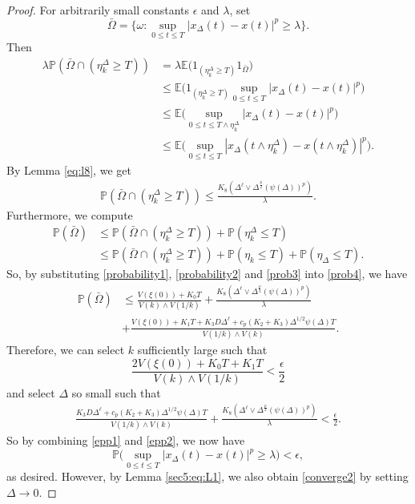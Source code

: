 \documentclass[11pt]{article}
\begin{document}
\begin{proof}
For arbitrarily small constants $\epsilon$ and $\lambda$, set
\begin{equation*}
\bar{\Omega}=\Big\{\omega: \sup_{0\leq t \leq T}|x_{\Delta}(t)-x(t)|^p\ge \lambda\Big\}.
\end{equation*}
Then
\begin{align*}
\lambda\mathbb{P}(\bar{\Omega}\cap(\eta^{\Delta}_k\ge T))&=\lambda\mathbb{E}\Big( 1_{(\eta^{\Delta}_k\ge T)} 1_{\bar{\Omega}}\Big)\\
&\le \mathbb{E}\Big( 1_{(\eta^{\Delta}_k\ge T)} \sup_{0\leq t \leq T}|x_{\Delta}(t)-x(t)|^p\Big)\\
&\le \mathbb{E}\Big(\sup_{0\leq t \leq T\wedge \eta^{\Delta}_k}|x_{\Delta}(t)-x(t)|^p\Big)\\
&\le \mathbb{E}\Big(\sup_{0\leq t \leq T}|x_{\Delta}(t\wedge \eta^{\Delta}_k)-x(t\wedge \eta^{\Delta}_k)|^p\Big). 
\end{align*}
By Lemma \ref{eq:l8}, we get
\begin{align}\label{prob3}
\mathbb{P}(\bar{\Omega}\cap(\eta^{\Delta}_k\ge T))\le \frac{K_8(\Delta^{\ell}\vee\Delta^{\frac{p}{2}}(\psi(\Delta))^p)}{\lambda}.
\end{align}
Furthermore, we compute
\begin{align}\label{prob4}
\mathbb{P}(\bar{\Omega})&\le \mathbb{P}(\bar{\Omega}\cap(\eta^{\Delta}_k\ge T))+\mathbb{P}(\eta^{\Delta}_k\le T)\nonumber\\
&\le \mathbb{P}(\bar{\Omega}\cap(\eta^{\Delta}_k\ge T))+\mathbb{P}(\eta_k\le T)+\mathbb{P}(\eta_{\Delta}\le T).
\end{align} 
So, by substituting \eqref{probability1}, \eqref{probability2} and \eqref{prob3} into \eqref{prob4}, we have
\begin{align}
\mathbb{P}(\bar{\Omega})&\le \frac{V(\xi(0))+K_0T}{V(k)\wedge V(1/k)}+ \frac{K_8(\Delta^{\ell}\vee\Delta^{\frac{p}{2}}(\psi(\Delta))^p)}{\lambda}\nonumber\\
&+\frac{V(\xi(0))+K_1T+K_3D\Delta^{\ell}+c_p(K_2+K_3)\Delta^{1/2}\psi(\Delta)T}{V(1/k)\wedge V(k)}.
\end{align}
Therefore, we can select $k$ sufficiently large such that
\begin{equation}\label{epp1}
\frac{2V(\xi(0))+K_0T+K_1T}{V(k)\wedge V(1/k)}< \frac{\epsilon}{2}
\end{equation}
and select $\Delta$ so small such that
\begin{align}\label{epp2}
\frac{K_3D\Delta^{\ell}+c_p(K_2+K_3)\Delta^{1/2}\psi(\Delta)T}{V(1/k)\wedge V(k)}+\frac{K_8(\Delta^{\ell}\vee\Delta^{\frac{p}{2}}(\psi(\Delta))^p)}{\lambda}< \frac{\epsilon}{2}.
\end{align}
So by combining \eqref{epp1} and \eqref{epp2}, we now have 
\begin{equation}
\mathbb{P}\Big(\sup_{0\leq t \leq T}|x_{\Delta}(t)-x(t)|^p\ge \lambda\Big)< \epsilon,
\end{equation}
as desired. However, by Lemma \ref{sec5:eq:L1}, we also obtain \eqref{converge2} by setting $\Delta\rightarrow 0$.
\end{proof}
\end{document}
